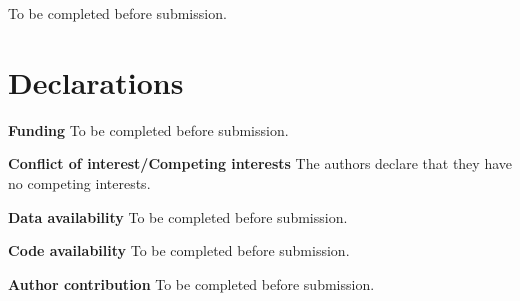 \documentclass[twocolumn]{svjour3}
\begin{document}








\begin{acknowledgements}
To be completed before submission.
\end{acknowledgements}

\section*{Declarations}

\noindent\textbf{Funding} To be completed before submission.

\noindent\textbf{Conflict of interest/Competing interests} The authors declare that they have no competing interests.

\noindent\textbf{Data availability} To be completed before submission.

\noindent\textbf{Code availability} To be completed before submission.

\noindent\textbf{Author contribution} To be completed before submission.



\end{document}
